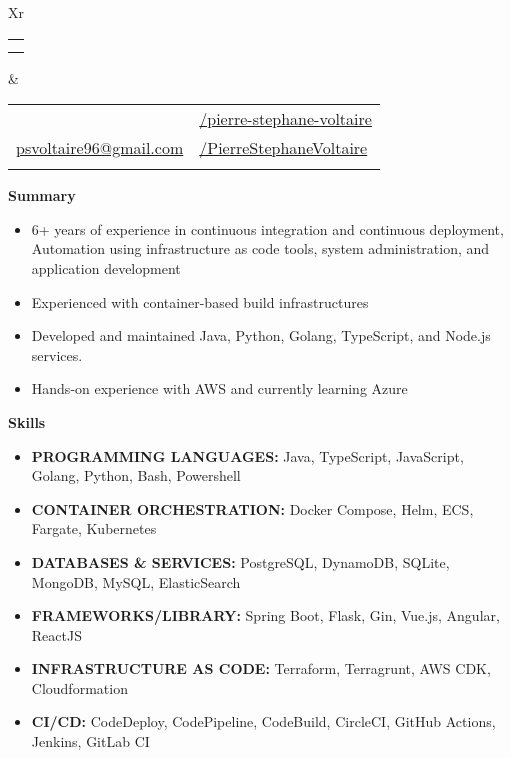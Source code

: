 \documentclass[letterpaper,11.9pt,arimo]{article}[leftmargin=*]
\makeatletter
\def \fullname {Pierre-Stéphane Voltaire}
\def \subtitle {}
\def \linkedinicon {\faLinkedin}
\def \linkedinlink {https://linkedin.com/in/pierre-stephane-voltaire/}
\def \linkedintext {/pierre-stephane-voltaire}
\def \phoneicon {\faPhone}
\def \phonetext {+1 (905)-616-0236}
\def \emailicon {\faEnvelope}
\def \emaillink {mailto:psvoltaire96@gmail.com}
\def \emailtext {psvoltaire96@gmail.com}
\def \GitHubicon {\faGithub}
\def \GitHublink {https://GitHub.com/PierreStephaneVoltaire}
\def \GitHubtext {/PierreStephaneVoltaire}
\def \headertype {\doublecol}
\def \entryspacing {-2pt}
\def \linkedin {\linkedinicon \hspace{3pt}\href{\linkedinlink}{\linkedintext}}
\def \phone {\phoneicon \hspace{3pt}{ \phonetext}}
\def \email {\emailicon \hspace{3pt}\href{\emaillink}{\emailtext}}
\def \GitHub {\GitHubicon \hspace{3pt}\href{\GitHublink}{\GitHubtext}}
\def \website {\websiteicon \hspace{3pt}\href{\websitelink}{\websitetext}}
\renewcommand{\section}[2]{\vspace{5pt}
\colorbox{secondary}{\color{white}\raggedbottom\normalsize\textbf{{#1}{\hspace{7pt}#2}}}
}
\newcommand{\resumeEntryStart}{\begin{itemize}[leftmargin=2.5mm]}
\newcommand{\resumeEntryEnd}{\end{itemize}\vspace{\entryspacing}}
\newcommand{\resumeItemListStart}{\begin{itemize}[leftmargin=4.5mm]}
\newcommand{\resumeItemListEnd}{\end{itemize}}
\newcommand{\resumeItem}[1]{
    \item\small{
            {#1 \vspace{-3pt}}
    }
}
\newcommand{\resumeEntryS}[2]{
    \item[]\small{
        \textbf{\color{primary}#1 }{ #2}
    }
}
\newcommand{\doublecol}[6]{
    \begin{tabularx}{\textwidth}{Xr}
    {
        \begin{tabular}[c]{l}
        \fontsize{20}{15}\selectfont{\color{primary}{{\textbf{\fullname}}}} \\
        {\textit{\subtitle}}
        \end{tabular}
    } & {
        \begin{tabular}[c]{l@{\hspace{1.5em}}l}
        {\small#4} & {\small#1} \\
        {\small#5} & {\small#2} \\
        {\small#6} & {\small#3}
        \end{tabular}
    }
    \end{tabularx}
}
\makeatother
\begin{document}
    \headertype{\linkedin}{\GitHub}{\website}{\phone}{\email}{}
    \vspace{-6pt}


    \section{\faListAlt}{Summary}

    \resumeEntryStart
    \resumeItemListStart
    \resumeItem{6+ years of experience in continuous integration and continuous deployment, Automation using infrastructure as code tools, system administration, and application development }
    \resumeItem {Experienced with container-based build infrastructures}
    \resumeItem {Developed and maintained Java, Python, Golang, TypeScript, and Node.js services.}
    \resumeItem {Hands-on experience with AWS and currently learning Azure}
    \resumeItemListEnd
    \resumeEntryEnd


    \section{\faGears}{Skills}
    \begin{multicols}{3}

        \resumeEntryStart

        \resumeEntryS{PROGRAMMING LANGUAGES: } {Java,
            TypeScript, JavaScript, Golang, Python, Bash, Powershell}
        \resumeEntryS{CONTAINER ORCHESTRATION:} {Docker Compose, Helm,
            ECS, Fargate, Kubernetes\hspace{35}}
        \resumeEntryS{DATABASES \& SERVICES:} {PostgreSQL, DynamoDB, SQLite, MongoDB, MySQL, ElasticSearch}
        \resumeEntryS{FRAMEWORKS/LIBRARY: } {Spring Boot, Flask, Gin, Vue.js, Angular, ReactJS \hspace{35}}
        \resumeEntryS{INFRASTRUCTURE AS CODE: } {Terraform, Terragrunt, AWS CDK, Cloudformation}

        \resumeEntryS{CI/CD:}  {CodeDeploy, CodePipeline, CodeBuild, CircleCI, GitHub Actions, Jenkins, GitLab CI}

        \resumeEntryEnd
    \end{multicols}
    \vspace{-12pt}
\end{document}
